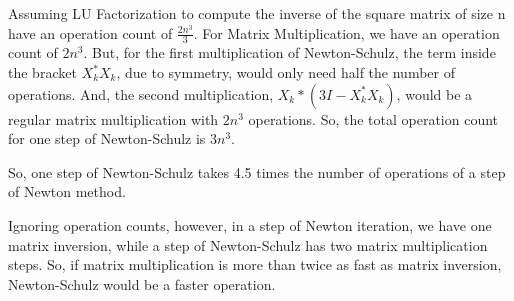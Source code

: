 \documentclass{article}
\begin{document}
\begin{flushleft}

Assuming LU Factorization to compute the inverse of the square matrix of size n have an operation count of $\frac{2n^3}{3}$. For Matrix Multiplication, we have an operation count of $2n^3$. But, for the first multiplication of Newton-Schulz, the term inside the bracket $X_k^* X_k$, due to symmetry, would only need half the number of operations. And, the second multiplication, $X_k * (3I - X_k^* X_k)$, would be a regular matrix multiplication with $2n^3$ operations. So, the total operation count for one step of Newton-Schulz is $3n^3$. 
\vspace{1mm}

So, one step of Newton-Schulz takes 4.5 times the number of operations of a step of Newton method.
\vspace{1mm}

Ignoring operation counts, however, in a step of Newton iteration, we have one matrix inversion, while a step of Newton-Schulz has two matrix multiplication steps. So, if matrix multiplication is more than twice as fast as matrix inversion, Newton-Schulz would be a faster operation.

\end{flushleft}
\end{document}
